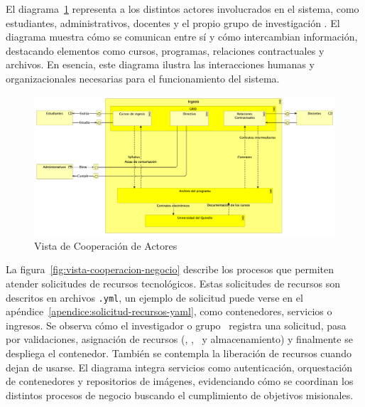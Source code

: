 El diagrama~\ref{fig:vista-cooperacion-actores} representa a los distintos actores involucrados en el sistema, como estudiantes, administrativos, docentes y el propio grupo de investigación \GRID. El diagrama muestra cómo se comunican entre sí y cómo intercambian información, destacando elementos como cursos, programas, relaciones contractuales y archivos. En esencia, este diagrama ilustra las interacciones humanas y organizacionales necesarias para el funcionamiento del sistema.

\begin{figure}[H]
    \centering
    \includegraphics[scale=0.16]{tablas-images/cp6/Actor-Cooperation-view.png}
    \caption{Vista de Cooperación de Actores}\label{fig:vista-cooperacion-actores}
\end{figure}
\noindent
La figura~\ref{fig:vista-cooperacion-negocio} describe los procesos que permiten atender solicitudes de recursos tecnológicos. Estas solicitudes de recursos son descritos en archivos \texttt{.yml}, un ejemplo de solicitud puede verse en el apéndice~\ref{apendice:solicitud-recursos-yaml}, como contenedores, servicios o ingresos. Se observa cómo el investigador o grupo \GRID\ registra una solicitud, pasa por validaciones, asignación de recursos (\CPU, \RAM, \GPU\ y almacenamiento) y finalmente se despliega el contenedor. También se contempla la liberación de recursos cuando dejan de usarse. El diagrama integra servicios como autenticación, orquestación de contenedores y repositorios de imágenes, evidenciando cómo se coordinan los distintos procesos de negocio buscando el cumplimiento de objetivos misionales.

